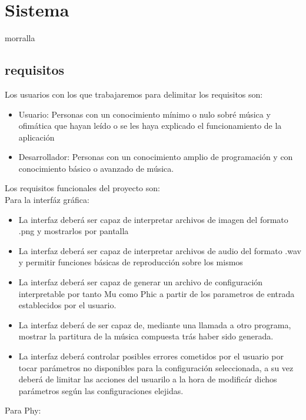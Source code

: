 \section{Sistema}

morralla


\subsection{requisitos}
Los usuarios con los que trabajaremos para delimitar los requisitos son:
\begin{itemize}
	\item Usuario: Personas con un conocimiento mínimo o nulo sobré música y ofimática que hayan leído o se les haya explicado el funcionamiento de la aplicación
	\item Desarrollador: Personas con un conocimiento amplio de programación y con conocimiento básico o avanzado de música.
\end{itemize}
Los requisitos funcionales del proyecto son:
\\Para la interfáz gráfica:
 \begin{itemize}
	 \item La interfaz deberá ser capaz de interpretar archivos de imagen del formato .png y mostrarlos por pantalla
	 \item La interfaz deberá ser capaz de interpretar archivos de audio del formato .wav y permitir funciones básicas de reproducción sobre los mismos
	 \item La interfaz deberá ser capaz de generar un archivo de configuración interpretable por tanto Mu como Phic a partir de los parametros de entrada establecidos por el usuario.
	 \item La interfaz deberá de ser capaz de, mediante una llamada a otro programa, mostrar la partitura de la música compuesta trás haber sido generada.
	 \item La interfaz deberá controlar posibles errores cometidos por el usuario por tocar parámetros no disponibles para la configuración seleccionada, a su vez deberá de limitar las acciones del usuarilo a la hora de modificár dichos parámetros según las configuraciones elejidas.
 \end{itemize}
 Para Phy:
